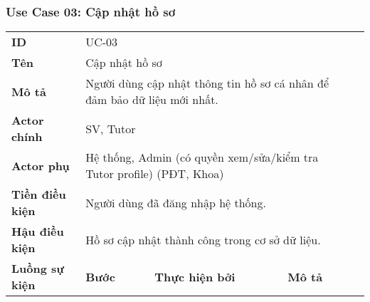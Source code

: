 \subsubsection*{Use Case 03: Cập nhật hồ sơ}
\begin{samepage}
\begin{table}[h!]
\begin{tabular}{|l|lll|l}
\cline{1-4}
\textbf{ID}                              & \multicolumn{3}{l|}{UC-03}                                                                                                                                                                                &  \\ \cline{1-4}
\textbf{Tên}                             & \multicolumn{3}{l|}{Cập nhật hồ sơ}                                                                                                                                                                       &  \\ \cline{1-4}
\textbf{Mô tả}                           & \multicolumn{3}{l|}{Người dùng cập nhật thông tin hồ sơ cá nhân để đảm bảo dữ liệu mới nhất.}                                                                                                             &  \\ \cline{1-4}
\textbf{Actor chính}                     & \multicolumn{3}{l|}{SV, Tutor}                                                                                                                                                                            &  \\ \cline{1-4}
\textbf{Actor phụ}                       & \multicolumn{3}{l|}{Hệ thống, Admin (có quyền xem/sửa/kiểm tra Tutor profile) (PĐT, Khoa)}                                                                                                                &  \\ \cline{1-4}
\textbf{Tiền điều kiện}                  & \multicolumn{3}{l|}{Người dùng đã đăng nhập hệ thống.}                                                                                                                                                    &  \\ \cline{1-4}
\textbf{Hậu điều kiện}                   & \multicolumn{3}{l|}{Hồ sơ cập nhật thành công trong cơ sở dữ liệu.}                                                                                                                                       &  \\ \cline{1-4}
\multirow{6}{*}{\textbf{Luồng sự kiện}}  & \multicolumn{1}{l|}{\textbf{Bước}} & \multicolumn{1}{l|}{\textbf{Thực hiện bởi}} & \textbf{Mô tả}                                                                                                         &  \\ \cline{2-4}

\end{tabular}
\end{table}
\end{samepage}
